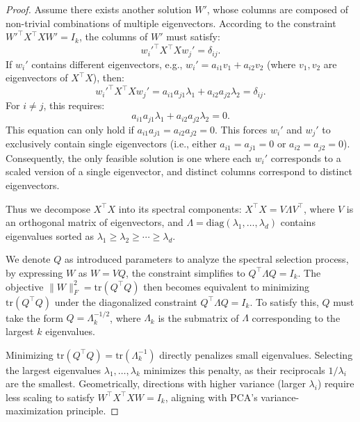 \documentclass{article}
\begin{document}
\begin{proof}
Assume there exists another solution \( W' \), whose columns are composed of non-trivial combinations of multiple eigenvectors. According to the constraint \( W'^\top X^\top X W' = I_k \), the columns of \( W' \) must satisfy:  
\begin{equation}
w_i'^\top X^\top X w_j' = \delta_{ij}.
\end{equation}
If \( w_i' \) contains different eigenvectors, e.g., \( w_i' = a_{i1}v_1 + a_{i2}v_2 \) (where \( v_1, v_2 \) are eigenvectors of \( X^\top X \)), then:  
\begin{equation}
    w_i'^\top X^\top X w_j' = a_{i1}a_{j1}\lambda_1 + a_{i2}a_{j2}\lambda_2 = \delta_{ij}.
\end{equation}  
For \( i \neq j \), this requires:  
\begin{equation}
    a_{i1}a_{j1}\lambda_1 + a_{i2}a_{j2}\lambda_2 = 0.    
\end{equation}
This equation can only hold if \( a_{i1}a_{j1} = a_{i2}a_{j2} = 0 \). This forces \( w_i' \) and \( w_j' \) to exclusively contain single eigenvectors (i.e., either \( a_{i1} = a_{j1} = 0 \) or \( a_{i2} = a_{j2} = 0 \)). Consequently, the only feasible solution is one where each \( w_i' \) corresponds to a scaled version of a single eigenvector, and distinct columns correspond to distinct eigenvectors.  


Thus we decompose \( X^\top X \) into its spectral components: \( X^\top X = V \Lambda V^\top \), where \( V \) is an orthogonal matrix of eigenvectors, and \( \Lambda = \text{diag}(\lambda_1, \dots, \lambda_d) \) contains eigenvalues sorted as \( \lambda_1 \geq \lambda_2 \geq \cdots \geq \lambda_d \).  

We denote $Q$ as introduced parameters to analyze the spectral selection process, by expressing \( W \) as \( W = V Q \), the constraint simplifies to \( Q^\top \Lambda Q = I_k \). The objective \( \|W\|_F^2 = \text{tr}(Q^\top Q) \) then becomes equivalent to minimizing \( \text{tr}(Q^\top Q) \) under the diagonalized constraint \( Q^\top \Lambda Q = I_k \). To satisfy this, \( Q \) must take the form \( Q = \Lambda_k^{-1/2} \), where \( \Lambda_k \) is the submatrix of \( \Lambda \) corresponding to the largest \( k \) eigenvalues.  

Minimizing \( \text{tr}(Q^\top Q) = \text{tr}(\Lambda_k^{-1}) \) directly penalizes small eigenvalues. Selecting the largest eigenvalues \( \lambda_1, \dots, \lambda_k \) minimizes this penalty, as their reciprocals \( 1/\lambda_i \) are the smallest. Geometrically, directions with higher variance (larger \( \lambda_i \)) require less scaling to satisfy \( W^\top X^\top X W = I_k \), aligning with PCA’s variance-maximization principle.  


\end{proof}
\end{document}
